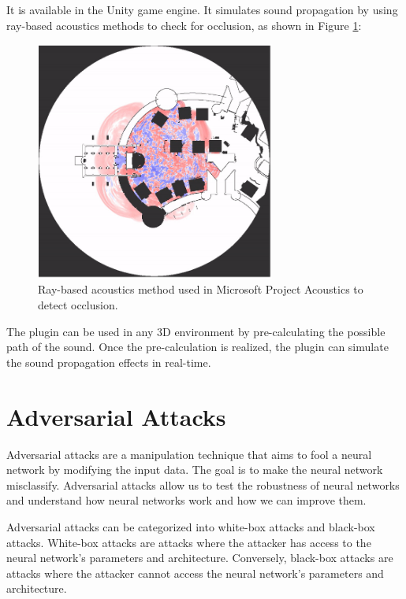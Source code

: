 It is available in the Unity game engine. It simulates sound propagation by using ray-based acoustics methods to check for occlusion, as shown in Figure \ref{fig:microsoft_ray_based_acoustics}:

\begin{figure}[H]
    \centering
    \includegraphics[width=0.7\textwidth]{../Images/microsoft_ray_based_acoustics.png}
    \caption{Ray-based acoustics method used in Microsoft Project Acoustics to detect occlusion\cite{rosen2020interactive}.}
    \label{fig:microsoft_ray_based_acoustics}
\end{figure}

The plugin can be used in any 3D environment by pre-calculating the possible path of the sound. Once the pre-calculation is realized, the plugin can simulate the sound propagation effects in real-time.

\section{Adversarial Attacks}
\label{sec:adversarial_attacks}

Adversarial attacks are a manipulation technique that aims to fool a neural network by modifying the input data. The goal is to make the neural network misclassify. Adversarial attacks allow us to test the robustness of neural networks and understand how neural networks work and how we can improve them.

Adversarial attacks can be categorized into white-box attacks and black-box attacks. White-box attacks are attacks where the attacker has access to the neural network's parameters and architecture. Conversely, black-box attacks are attacks where the attacker cannot access the neural network's parameters and architecture.

